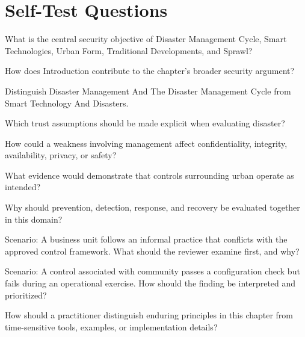 \documentclass[11pt,letterpaper]{article}
\begin{document}
\section*{Self-Test Questions}
\begin{CornellRecallList}
\item What is the central security objective of Disaster Management Cycle, Smart Technologies, Urban Form, Traditional Developments, and Sprawl?
\item How does Introduction contribute to the chapter's broader security argument?
\item Distinguish Disaster Management And The Disaster Management Cycle from Smart Technology And Disasters.
\item Which trust assumptions should be made explicit when evaluating disaster?
\item How could a weakness involving management affect confidentiality, integrity, availability, privacy, or safety?
\item What evidence would demonstrate that controls surrounding urban operate as intended?
\item Why should prevention, detection, response, and recovery be evaluated together in this domain?
\item Scenario: A business unit follows an informal practice that conflicts with the approved control framework. What should the reviewer examine first, and why?
\item Scenario: A control associated with community passes a configuration check but fails during an operational exercise. How should the finding be interpreted and prioritized?
\item How should a practitioner distinguish enduring principles in this chapter from time-sensitive tools, examples, or implementation details?
\end{CornellRecallList}
\end{document}
